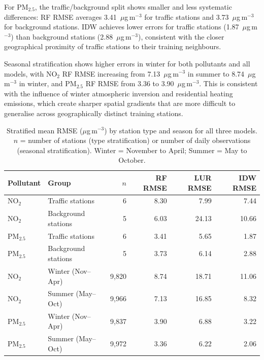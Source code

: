 \documentclass[11pt,a4paper]{article}
\begin{document}
For PM$_{2.5}$, the traffic/background split shows smaller and less systematic differences: RF RMSE averages 3.41~$\mu$g\,m$^{-3}$ for traffic stations and 3.73~$\mu$g\,m$^{-3}$ for background stations. IDW achieves lower errors for traffic stations (1.87~$\mu$g\,m$^{-3}$) than background stations (2.88~$\mu$g\,m$^{-3}$), consistent with the closer geographical proximity of traffic stations to their training neighbours.

Seasonal stratification shows higher errors in winter for both pollutants and all models, with NO$_2$ RF RMSE increasing from 7.13~$\mu$g\,m$^{-3}$ in summer to 8.74~$\mu$g\,m$^{-3}$ in winter, and PM$_{2.5}$ RF RMSE from 3.36 to 3.90~$\mu$g\,m$^{-3}$. This is consistent with the influence of winter atmospheric inversion and residential heating emissions, which create sharper spatial gradients that are more difficult to generalise across geographically distinct training stations.

\begin{table}[htbp]
\caption{Stratified mean RMSE ($\mu$g\,m$^{-3}$) by station type and season for all three models. $n$ = number of stations (type stratification) or number of daily observations (seasonal stratification). Winter = November to April; Summer = May to October.}
\label{tab:stratification}
\small
\begin{tabular}{llrrrr}
\toprule
\textbf{Pollutant} & \textbf{Group} & \textbf{$n$} & \textbf{RF RMSE} & \textbf{LUR RMSE} & \textbf{IDW RMSE} \\
\midrule
NO$_2$    & Traffic stations   & 6      & 8.30  & 7.99  & 7.44  \\
NO$_2$    & Background stations & 5      & 6.03  & 24.13 & 10.66 \\
\midrule
PM$_{2.5}$ & Traffic stations   & 6      & 3.41  & 5.65  & 1.87  \\
PM$_{2.5}$ & Background stations & 5      & 3.73  & 6.14  & 2.88  \\
\midrule
NO$_2$    & Winter (Nov--Apr)  & 9,820  & 8.74  & 18.71 & 11.06 \\
NO$_2$    & Summer (May--Oct)  & 9,966  & 7.13  & 16.85 & 8.32  \\
\midrule
PM$_{2.5}$ & Winter (Nov--Apr) & 9,837  & 3.90  & 6.88  & 3.22  \\
PM$_{2.5}$ & Summer (May--Oct) & 9,972  & 3.36  & 6.22  & 2.06  \\
\bottomrule
\end{tabular}
\end{table}
\end{document}
